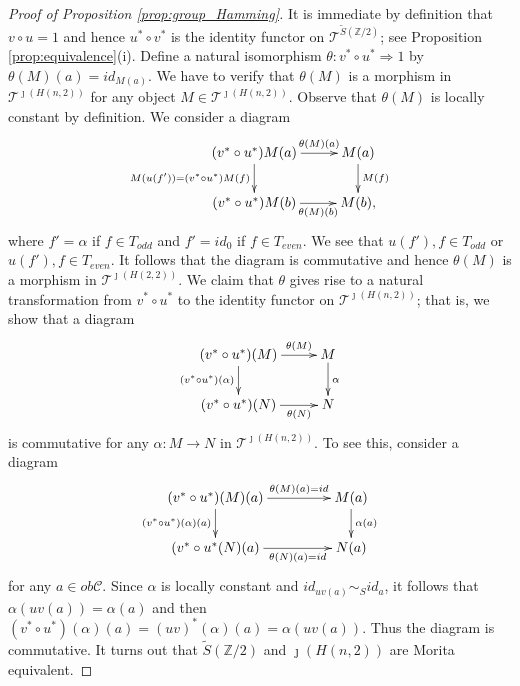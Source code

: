 \documentclass{amsart}
\theoremstyle{definition}
\theoremstyle{remark}
\newcommand{\C}{{\mathcal C}}
\newcommand{\T}{{\mathcal T}}
\begin{document}
\begin{proof}[Proof of Proposition \ref{prop:group_Hamming}]
It is immediate by definition that $v\circ u=1$ and hence $u^*\circ v^*$ is the identity functor on $\T^{\widetilde{S}({\mathbb Z}/2)}$;
see Proposition \ref{prop:equivalence}(i). 
Define a natural isomorphism $\theta : v^*\circ u^* \Rightarrow 1$ by 
$\theta(M)(a) = id_{M(a)}$. We have to verify that  $\theta(M)$ is a morphism in $\T^{\jmath(H(n, 2))}$ for any 
object $M \in \T^{\jmath(H(n, 2))}$. Observe that $\theta(M)$ is locally constant by definition. 
We consider a diagram 
$$
\xymatrix@C25pt@R20pt{
(v^*\circ u^*)M(a) \ar[r]^-{\theta(M)(a)} \ar[d]_{M(u(f'))=(v^*\circ u^*)M(f)}& M(a) \ar[d]^{M(f)}  \\ %
(v^*\circ u^*)M(b) \ar[r]_-{\theta(M)(b)} & M(b),                                                                     %
}
$$
where 
$f' = \alpha$ if $f \in T_{odd}$ and $f' = id_0$ if $f \in T_{even}$. We see that $u(f'), f \in T_{odd}$ or 
$u(f'), f \in T_{even}$. It follows that the diagram is commutative and hence 
$\theta(M)$ is a morphism in $\T^{\jmath(H(2,2))}$.  
We claim that $\theta$ gives rise to a natural transformation from $v^*\circ u^*$ to the identity functor on $\T^{\jmath(H(n, 2))}$; that is, we show that  
a diagram 
$$
\xymatrix@C25pt@R20pt{
(v^*\circ u^*)(M) \ar[r]^-{\theta(M)} \ar[d]_{(v^*\circ u^*)(\alpha)}& M \ar[d]^{\alpha} \\
(v^*\circ u^*)(N) \ar[r]_-{\theta(N)} & N    
}
$$
is commutative for any $\alpha : M \to N$ in $\T^{\jmath(H(n,2))}$. To see this, consider a diagram 
$$
\xymatrix@C45pt@R20pt{
(v^*\circ u^*)(M)(a) \ar[r]^-{\theta(M)(a)=id} \ar[d]_-{(v^*\circ u^*)(\alpha)(a)} & M(a) \ar[d]^{\alpha(a)} \\
(v^*\circ u^*(N)(a) \ar[r]_-{\theta(N)(a) = id} & N(a)     
}
$$
for any $a \in ob \C$. 
Since $\alpha$ is locally constant and $id_{uv(a)}\sim_S id_{a}$, it follows that 
$\alpha(uv(a)) =\alpha(a)$ and then $(v^*\circ u^*)(\alpha)(a)=(uv)^*(\alpha)(a) =  \alpha(uv(a))$. 
Thus the diagram is commutative. 
It turns out  that $\widetilde{S}({\mathbb Z}/2)$ and  $\jmath(H(n, 2))$ are Morita equivalent. 
\end{proof}
\end{document}
